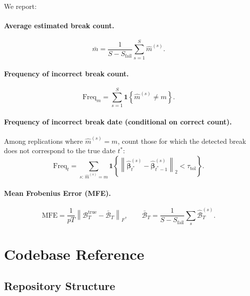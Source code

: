 \documentclass[12pt, a4paper]{article}
\theoremstyle{plain}
\theoremstyle{definition}
\theoremstyle{remark}
\newcommand{\bB}{\mathcal{B}}
\newcommand{\bbeta}{\bm{\beta}}
\newcommand{\norm}[1]{\left\| #1 \right\|}
\begin{document}
\begin{onehalfspacing}
We report:

\paragraph{Average estimated break count.}
\begin{equation}
  \bar{m} = \frac{1}{S - S_{\text{fail}}} \sum_{s=1}^{S} \hat{m}^{(s)}.
\end{equation}

\paragraph{Frequency of incorrect break count.}
\begin{equation}
  \text{Freq}_m = \sum_{s=1}^{S} \mathbf{1}\!\left\{\hat{m}^{(s)} \ne m\right\}.
\end{equation}

\paragraph{Frequency of incorrect break date (conditional on correct count).}
Among replications where $\hat{m}^{(s)} = m$, count those for which the
detected break does not correspond to the true date $t^*$:
\begin{equation}
  \text{Freq}_t = \sum_{s:\,\hat{m}^{(s)}=m}
    \mathbf{1}\!\left\{
      \norm{\hat{\bbeta}_{t^*}^{(s)} - \hat{\bbeta}_{t^*-1}^{(s)}}_2
      < \tau_\text{tol}
    \right\}.
\end{equation}

\paragraph{Mean Frobenius Error (MFE).}
\begin{equation}
  \label{eq:mfe}
  \text{MFE} = \frac{1}{pT}
    \norm{\bB_T^{\text{true}} - \bar{\bB}_T}_F, \qquad
  \bar{\bB}_T = \frac{1}{S - S_{\text{fail}}}
    \sum_s \hat{\bB}_T^{(s)}.
\end{equation}

\section{Codebase Reference}
\label{sec:code}

\subsection{Repository Structure}


\end{onehalfspacing}
\end{document}
